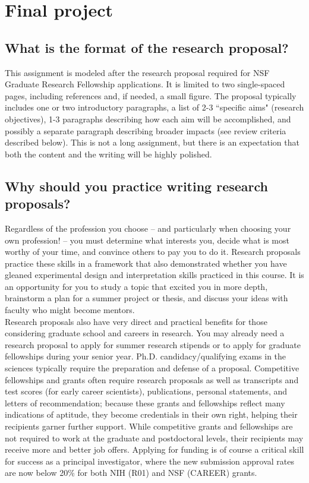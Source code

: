 \documentclass{article}
\begin{document}
\large

\section*{Final project}

\subsection*{What is the format of the research proposal?}

This assignment is modeled after the research proposal required for NSF Graduate Research Fellowship applications. It is limited to two single-spaced pages, including references and, if needed, a small figure. The proposal typically includes one or two introductory paragraphs, a list of 2-3 ``specific aims" (research objectives), 1-3 paragraphs describing how each aim will be accomplished, and possibly a separate paragraph describing broader impacts (see review criteria described below). This is not a long assignment, but there is an expectation that both the content and the writing will be highly polished.

\subsection*{Why should you practice writing research proposals?}

Regardless of the profession you choose -- and particularly when choosing your own profession! -- you must determine what interests you, decide what is most worthy of your time, and convince others to pay you to do it. Research proposals practice these skills in a framework that also demonstrated whether you have gleaned experimental design and interpretation skills practiced in this course. It is an opportunity for you to study a topic that excited you in more depth, brainstorm a plan for a summer project or thesis, and discuss your ideas with faculty who might become mentors.\\

Research proposals also have very direct and practical benefits for those considering graduate school and careers in research. You may already need a research proposal to apply for summer research stipends or to apply for graduate fellowships during your senior year. Ph.D. candidacy/qualifying exams in the sciences typically require the preparation and defense of a proposal. Competitive fellowships and grants often require research proposals as well as transcripts and test scores (for early career scientists), publications, personal statements, and letters of recommendation; because these grants and fellowships reflect many indications of aptitude, they become credentials in their own right, helping their recipients garner further support. While competitive grants and fellowships are not required to work at the graduate and postdoctoral levels, their recipients may receive more and better job offers. Applying for funding is of course a critical skill for success as a principal investigator, where the new submission approval rates are now below 20\% for both NIH (R01) and NSF (CAREER) grants.
\end{document}
